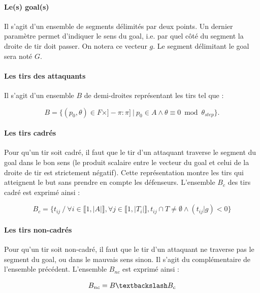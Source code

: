\documentclass[12pt]{article}
\begin{document}
\paragraph{Le(s) goal(s)} Il s'agit d'un ensemble de segments délimités par deux points. Un dernier paramètre permet d'indiquer le sens du goal, i.e. par quel \og côté \fg{} du segment la droite de tir doit passer. On notera ce vecteur $g$. Le segment délimitant le goal sera noté $G$.

\paragraph{Les tirs des attaquants} Il s'agit d'un ensemble $B$ de demi-droites représentant les tirs tel que :

\begin{equation*}
    B = \{ (p_0, \theta) \in F \times ]-\pi: \pi] \ | \ p_0 \in A \wedge \theta \equiv 0 \bmod \theta_{step} \}.
\end{equation*}

\paragraph{Les tirs cadrés}
Pour qu'un tir soit cadré, il faut que le tir d'un attaquant traverse le segment du goal dans le bon sens (le produit scalaire entre le vecteur du goal et celui de la droite de tir est strictement négatif). Cette représentation montre les tirs qui atteignent le but sans prendre en compte les défenseurs. L'ensemble $B_c$ des tirs cadré est exprimé ainsi :

\begin{equation*}
    B_c = \{ t_{ij} \ / \ \forall i \in \llbracket 1, |A| \rrbracket, \forall j \in \llbracket 1, |T_i| \rrbracket, t_{ij} \cap T \ne \emptyset \wedge (t_{ij}|g) < 0  \} %
\end{equation*}


\paragraph{Les tirs non-cadrés}
Pour qu'un tir soit non-cadré, il faut que le tir d'un attaquant ne traverse pas le segment du goal, ou dans le mauvais sens sinon. Il s'agit du complémentaire de l'ensemble précédent. L'ensemble $B_{nc}$ est exprimé ainsi :

\begin{equation*}
    B_{nc} = B \textbackslash B_c
\end{equation*}
\end{document}
